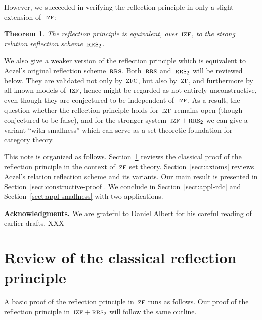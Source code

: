 \documentclass[oneside,reqno]{amsart}
\theoremstyle{definition}
\theoremstyle{plain}
\newtheorem{thm}[defn]{Theorem}
\theoremstyle{remark}
\renewcommand{\_}{\mathpunct{.}\,}
\newcommand{\?}{\,{:}\,}
\newcommand{\ZF}{\textsc{zf}}
\newcommand{\IZF}{\textsc{izf}}
\newcommand{\ZFC}{\textsc{zfc}}
\newcommand{\RRS}{\textsc{rrs}}
\begin{document}
However, we succeeded in verifying the reflection principle in only a slight
extension of~$\IZF$:

\begin{thm}The reflection principle is equivalent, over~$\IZF$, to the strong
relation reflection scheme~$\RRS_2$.\end{thm}

We also give a weaker version of the reflection principle which is equivalent
to Aczel's original reflection scheme~$\RRS$.
Both~$\RRS$ and~$\RRS_2$ will be reviewed below. They are validated not
only by~$\ZFC$, but also by~$\ZF$, and furthermore by
all known models of~$\IZF$, hence might be regarded as not entirely
unconstructive, even though they are conjectured to be independent of~$\IZF$. As a
result, the question whether the reflection principle holds for~$\IZF$ remains
open (though conjectured to be false), and for the stronger system~$\IZF+\RRS_2$
we can give a variant ``with smallness'' which can serve as a set-theoretic
foundation for category theory.


This note is organized as follows. Section~\ref{sect:review} reviews the
classical proof of the reflection principle in the context of~$\ZF$ set theory.
Section~\ref{sect:axioms} reviews Aczel's relation reflection scheme and its
variants. Our main result is presented in Section~\ref{sect:constructive-proof}.
We conclude in Section~\ref{sect:appl-rdc} and
Section~\ref{sect:appl-smallness} with two applications.

\textbf{Acknowledgments.} We are grateful to Daniel Albert for his careful
reading of earlier drafts. XXX



\section{Review of the classical reflection principle}
\label{sect:review}

A basic proof of the reflection principle in~$\ZF$ runs as follows. Our proof
of the reflection principle in~$\IZF+\RRS_2$ will follow the same outline.
\end{document}
